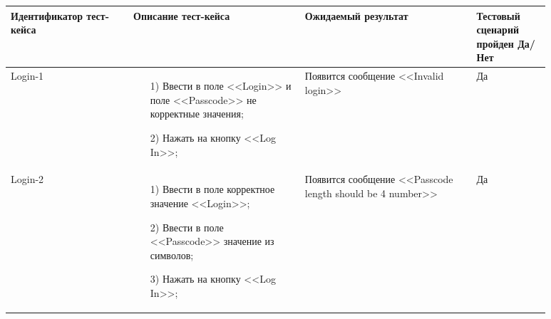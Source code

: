   \begin{longtable}{| >{\raggedright}p{0.20\linewidth} 
                  | >{\raggedright}p{0.28\linewidth} 
                  | >{\raggedright}p{0.28\linewidth} 
                  | >{\raggedright\arraybackslash}p{0.12\linewidth}|}
   \hline
   Идентификатор тест-кейса & Описание тест-кейса & Ожидаемый результат & Тестовый сценарий пройден Да/Нет \\
   \hline
   Login-1 & \begin{enumerate}
				\item[1)] Ввести в поле <<Login>> и поле <<Passcode>> не корректные значения;
				\item[2)] Нажать на кнопку <<Log In>>;
			\end{enumerate}
   			 & Появится сообщение <<Invalid login>> & Да \\

   \hline
   Login-2 & \begin{enumerate}
				\item[1)] Ввести в поле корректное значение <<Login>>;
				\item[2)] Ввести в поле <<Passcode>> значение из символов;
				\item[3)] Нажать на кнопку <<Log In>>;
			\end{enumerate}
			& Появится сообщение <<Passcode length should be 4 number>> & Да \\


\end{longtable}
